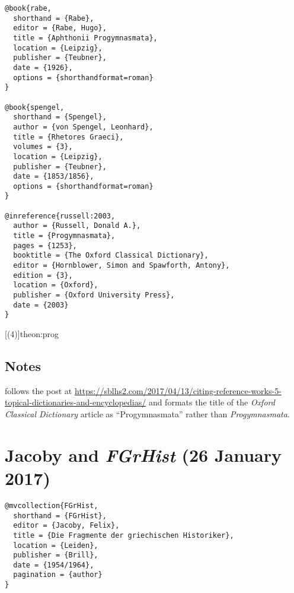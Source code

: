 \documentclass[a4paper]{article}
\begin{document}
\begin{verbatim}
@book{rabe,
  shorthand = {Rabe},
  editor = {Rabe, Hugo},
  title = {Aphthonii Progymnasmata},
  location = {Leipzig},
  publisher = {Teubner},
  date = {1926},
  options = {shorthandformat=roman}
}

@book{spengel,
  shorthand = {Spengel},
  author = {von Spengel, Leonhard},
  title = {Rhetores Graeci},
  volumes = {3},
  location = {Leipzig},
  publisher = {Teubner},
  date = {1853/1856},
  options = {shorthandformat=roman}
}

@inreference{russell:2003,
  author = {Russell, Donald A.},
  title = {Progymnasmata},
  pages = {1253},
  booktitle = {The Oxford Classical Dictionary},
  editor = {Hornblower, Simon and Spawforth, Antony},
  edition = {3},
  location = {Oxford},
  publisher = {Oxford University Press},
  date = {2003}
}
\end{verbatim}

[(4)]{theon:prog}
\begin{verbcite}
  \nocite{gibson, kennedy:2003, patillonandbolognesi, rabe:1913, russell:2003}
\end{verbcite}
\exampleabbreviations
\examplebibliography

\subsection{Notes}

 follows the post at
\url{https://sblhs2.com/2017/04/13/citing-reference-works-5-topical-dictionaries-and-encyclopedias/}
and formats the title of the \emph{Oxford Classical Dictionary} article as
“Progymnasmata” rather than \emph{Progymnasmata}.


\section{Jacoby and \emph{FGrHist} (26 January 2017)}

\begin{verbatim}
@mvcollection{FGrHist,
  shorthand = {FGrHist},
  editor = {Jacoby, Felix},
  title = {Die Fragmente der griechischen Historiker},
  location = {Leiden},
  publisher = {Brill},
  date = {1954/1964},
  pagination = {author}
}
\end{verbatim}
\end{document}
